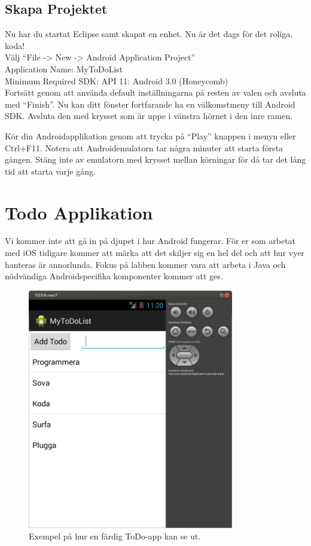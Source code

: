 \documentclass[11 pt, titlepage]{article} %
\begin{document}
\subsection{Skapa Projektet}
Nu har du startat Eclipse samt skapat en enhet. 
Nu är det dags för det roliga, koda!\\

Välj “File -> New -> Android Application Project”\\ 
Application Name:  MyToDoList\\
Minimum Required SDK:  API 11: Android 3.0 (Honeycomb)\\
Fortsätt genom att använda default inställningarna på resten av valen och avsluta med “Finish”. 
Nu kan ditt fönster fortfarande ha en välkomstmeny till Android SDK. 
Avsluta den med krysset som är uppe i vänstra hörnet i den inre ramen.

Kör din Androidapplikation genom att trycka på “Play” knappen i menyn eller Ctrl+F11. 
Notera att Androidemulatorn tar några minuter att starta första gången. 
Stäng inte av emulatorn med krysset mellan körningar för då tar det lång tid att starta varje gång.

\section{Todo Applikation}
Vi kommer inte att gå in på djupet i hur Android fungerar. 
För er som arbetat med iOS tidigare kommer att märka att det skiljer sig en hel del och att hur vyer hanteras är annorlunda. 
Fokus på labben kommer vara att arbeta i Java och nödvändiga Androidspecifika komponenter kommer att ges.
\begin{figure}[ht!]
\centering
\includegraphics[width=90mm]{images/app.png}
\caption{Exempel på hur en färdig ToDo-app kan se ut.}
\label{overflow}
\end{figure}
\end{document}

